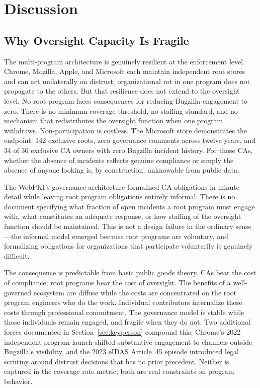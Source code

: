 \documentclass[10pt,twocolumn,letterpaper]{article}
\begin{document}
\section{Discussion}
\label{sec:discuss}

\subsection{Why Oversight Capacity Is Fragile}

The multi-program architecture is genuinely resilient at the enforcement
level. Chrome, Mozilla, Apple, and Microsoft each maintain independent root
stores and can act unilaterally on distrust; organizational rot in one
program does not propagate to the others. But that resilience does not
extend to the oversight level. No root program faces consequences for
reducing Bugzilla engagement to zero. There is no minimum coverage
threshold, no staffing standard, and no mechanism that redistributes the
oversight function when one program withdraws. Non-participation is
costless. The Microsoft store demonstrates the endpoint: 142 exclusive
roots, zero governance comments across twelve years, and 34 of 36
exclusive CA owners with zero Bugzilla incident history. For those CAs,
whether the absence of incidents reflects genuine compliance or simply the
absence of anyone looking is, by construction, unknowable from public data.

The WebPKI's governance architecture formalized CA obligations in minute
detail while leaving root program obligations entirely informal. There
is no document specifying what fraction of open incidents a root program
must engage with, what constitutes an adequate response, or how staffing
of the oversight function should be maintained. This is not a design
failure in the ordinary sense---the informal model emerged because root
programs are voluntary, and formalizing obligations for organizations
that participate voluntarily is genuinely difficult.

The consequence is predictable from basic public goods theory. CAs bear
the cost of compliance; root programs bear the cost of oversight. The
benefits of a well-governed ecosystem are diffuse while the costs are
concentrated on the root program engineers who do the work. Individual
contributors internalize these costs through professional commitment.
The governance model is stable while those individuals remain engaged,
and fragile when they do not. Two additional forces documented in
Section~\ref{sec:keyperson} compound this: Chrome's 2022 independent
program launch shifted substantive engagement to channels outside
Bugzilla's visibility, and the 2023 eIDAS Article~45 episode introduced
legal scrutiny around distrust decisions that has no prior precedent.
Neither is captured in the coverage rate metric; both are real constraints
on program behavior.
\end{document}

